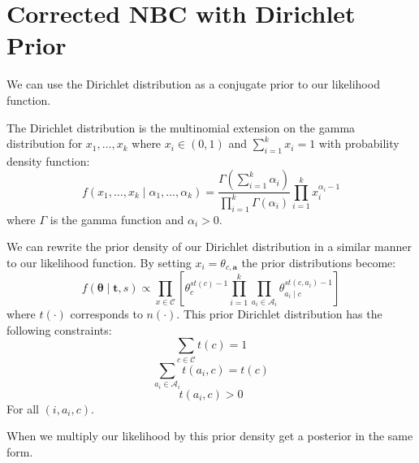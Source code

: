 \chapter{Corrected NBC with Dirichlet Prior}

We can use the Dirichlet distribution as a conjugate prior to our likelihood function.

The Dirichlet distribution is the multinomial extension on the gamma distribution for $x_1,\dots,x_k$ where $x_i \in (0,1)$ and $\sum_{i=1}^k x_i = 1$ with probability density function:
\begin{equation} \label{dirichlet_pdf}
	f(x_1,\dots,x_k \mid \alpha_1,\dots,\alpha_k) = \frac{\Gamma(\sum_{i=1}^k\alpha_i)}{\prod_{i=1}^k\Gamma(\alpha_i)} \prod_{i=1}^k x_i^{\alpha_i - 1}
\end{equation}
where $\Gamma$ is the gamma function and $\alpha_i > 0$.

We can rewrite the prior density of our Dirichlet distribution in a similar manner to our likelihood function. By setting $x_i = \theta_{c,\mathbf{a}}$ the prior distributions become:
\begin{equation} \label{prior}
	f(\mathbf{\theta} \mid \mathbf{t}, s) \propto \prod_{x \in \mathcal{C}} \left[ \theta_c^{st(c) - 1} \prod_{i=1}^k \prod_{a_i \in \mathcal{A}_i} \theta_{a_i \mid c}^{st(c, a_i) - 1} \right]
\end{equation}
where $t(\cdot)$ corresponds to $n(\cdot)$. This prior Dirichlet distribution \cite{Zaffalon01} has the following constraints:
\begin{equation}
	\sum_{c \in \mathcal{C}} t(c) = 1
\end{equation}
\begin{equation}
	\sum_{a_i \in \mathcal{A}_i} t(a_i, c) = t(c)
\end{equation}
\begin{equation}
	t(a_i, c) > 0
\end{equation}
For all $(i, a_i, c)$.

When we multiply our likelihood by this prior density get a posterior in the same form.